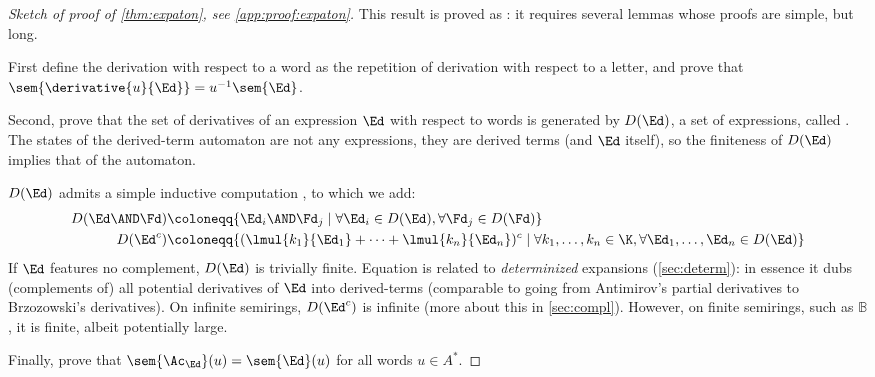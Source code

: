 \documentclass[a4paper,USenglish]{lipics}
\begin{document}
\begin{proof}[Sketch of proof of \cref{thm:expaton}, see \cref{app:proof:expaton}]
  This result is proved as \citep[Theorem~4]{lombardy.2005.tcs}: it requires
  several lemmas whose proofs are simple, but long.

  First define the derivation with respect to a word as the repetition of
  derivation with respect to a letter, and prove that
  $\sem{\derivative{u}{\Ed}} = u^{-1}\sem{\Ed}$.

  Second, prove that the set of derivatives of an expression $\Ed$ with
  respect to words is generated by $D(\Ed)$, a set of expressions, called
  .  The states of the derived-term automaton are not any
  expressions, they are derived terms (and $\Ed$ itself), so the finiteness
  of $D(\Ed)$ implies that of the automaton.

  $D(\Ed)$ admits a simple inductive computation \citep[Definition
  3]{lombardy.2005.tcs}, to which we add:
  \begin{align}
    \notag
    D(\Ed\AND \Fd)
    &\coloneqq \{\Ed_i \AND \Fd_j \mid \forall \Ed_i \in D(\Ed), \forall \Fd_j\in D(\Fd)\}
    \\
    \label{eq:d:compl}
    D(\Ed^c)
    &\coloneqq \{(\lmul{k_1}{\Ed_1} + \cdots + \lmul{k_n}{\Ed_n})^c \mid \forall k_1, \ldots, k_n \in \K, \forall \Ed_1, \ldots, \Ed_n \in D(\Ed)\}
  \end{align}
  If $\Ed$ features no complement, $D(\Ed)$ is trivially finite.  Equation
   is related to \emph{determinized} expansions
  (\cref{sec:determ}): in essence it dubs (complements of) all potential
  derivatives of $\Ed$ into derived-terms (comparable to going from
  Antimirov's partial derivatives to Brzozowski's derivatives).  On infinite
  semirings, $D(\Ed^c)$ is infinite (more about this in \cref{sec:compl}).
  However, on finite semirings, such as $\mathbb{B}$, it is finite, albeit
  potentially large.

  Finally, prove that $\sem{\Ac_\Ed}(u) = \sem{\Ed}(u)$ for all words
  $u\in A^*$.
\end{proof}
\end{document}
